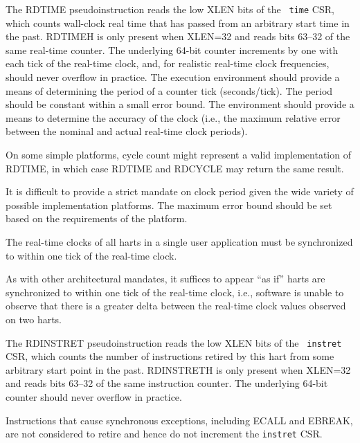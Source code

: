 The RDTIME pseudoinstruction reads the low XLEN bits of the {\tt
  time} CSR, which counts wall-clock real time that has passed from an
arbitrary start time in the past.
RDTIMEH is only present when XLEN=32 and reads bits 63--32 of the same
real-time counter.
The underlying 64-bit counter increments by one with each tick of the
real-time clock, and, for realistic real-time clock frequencies, should never
overflow in practice.
The execution environment should provide a means of determining the period of
a counter tick (seconds/tick).
The period should be constant within a small error bound.
The environment should provide a means to determine the accuracy of the clock
(i.e., the maximum relative error between the nominal and actual real-time
clock periods).

\begin{commentary}
On some simple platforms, cycle count might represent a valid
implementation of RDTIME, in which case RDTIME and RDCYCLE may
return the same result.

It is difficult to provide a strict mandate on clock period given the
wide variety of possible implementation platforms.  The maximum error
bound should be set based on the requirements of the platform.
\end{commentary}

The real-time clocks of all harts in a single user application
must be synchronized to within one tick of the real-time clock.

\begin{commentary}
As with other architectural mandates, it suffices to appear ``as if''
harts are synchronized to within one tick of the real-time clock,
i.e., software is unable to observe that there is a greater delta
between the real-time clock values observed on two harts.
\end{commentary}

The RDINSTRET pseudoinstruction reads the low XLEN bits of the {\tt
  instret} CSR, which counts the number of instructions retired by
this hart from some arbitrary start point in the past.  RDINSTRETH is
only present when XLEN=32 and reads bits 63--32 of the same
instruction counter. The underlying 64-bit counter should never
overflow in practice.

\begin{commentary}
Instructions that cause synchronous exceptions, including ECALL and EBREAK,
are not considered to retire and hence do not increment the {\tt instret} CSR.
\end{commentary}


